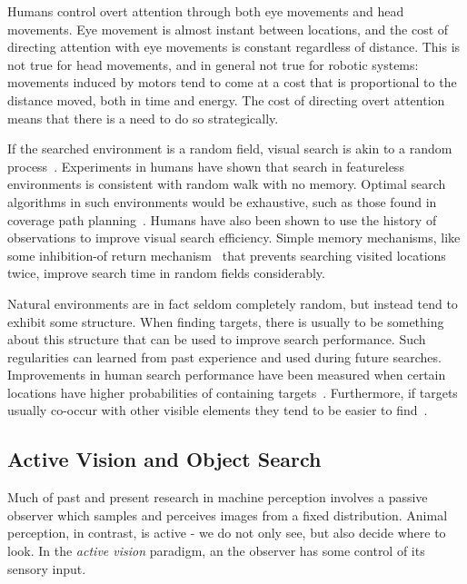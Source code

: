 Humans control overt attention through both eye movements and head movements.
Eye movement is almost instant between locations, and the cost of directing attention with eye movements is constant regardless of distance.
This is not true for head movements, and in general not true for robotic systems:
movements induced by motors tend to come at a cost that is proportional to the distance moved, both in time and energy.
The cost of directing overt attention means that there is a need to do so strategically.

If the searched environment is a random field, visual search is akin to a random process~\cite{nakayama_situating_2011}.
Experiments in humans have shown that search in featureless environments is consistent with random walk with no memory.
Optimal search algorithms in such environments would be exhaustive, such as those found in coverage path planning~\cite{galceran_carreras_2013}.
Humans have also been shown to use the history of observations to improve visual search efficiency. 
Simple memory mechanisms, like some inhibition-of return mechanism~\cite{itti_koch_2001} that prevents searching visited locations twice, improve search time in random fields considerably.

Natural environments are in fact seldom completely random, but instead tend to exhibit some structure.
When finding targets, there is usually to be something about this structure that can be used to improve search performance.
Such regularities can learned from past experience and used during future searches.
Improvements in human search performance have been measured when certain locations have higher probabilities of containing targets~\cite{eckstein_visual_2011,wolfe_five_2017}.
Furthermore, if targets usually co-occur with other visible elements they tend to be easier to find~\cite{eckstein_visual_2011,wolfe_five_2017}.

\subsection{Active Vision and Object Search} 
\label{sec:activevision}

Much of past and present research in machine perception involves a passive observer which samples and perceives images from a fixed distribution.
Animal perception, in contrast, is active - we do not only see, but also decide where to look.
In the \textit{active vision} paradigm, an the observer has some control of its sensory input.~\cite{aloimonos_active_1988}

